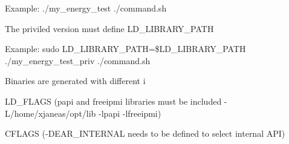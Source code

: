 Example\+: ./my\+\_\+energy\+\_\+test ./command.sh

The priviled version must define L\+D\+\_\+\+L\+I\+B\+R\+A\+R\+Y\+\_\+\+P\+A\+TH

Example\+: sudo L\+D\+\_\+\+L\+I\+B\+R\+A\+R\+Y\+\_\+\+P\+A\+TH=\$\+L\+D\+\_\+\+L\+I\+B\+R\+A\+R\+Y\+\_\+\+P\+A\+TH ./my\+\_\+energy\+\_\+test\+\_\+priv ./command.sh

Binaries are generated with different i


\begin{DoxyItemize}
\item L\+D\+\_\+\+F\+L\+A\+GS (papi and freeipmi libraries must be included -\/\+L/home/xjaneas/opt/lib -\/lpapi -\/lfreeipmi)
\item C\+F\+L\+A\+GS (-\/\+D\+E\+A\+R\+\_\+\+I\+N\+T\+E\+R\+N\+AL needs to be defined to select internal A\+PI) 
\end{DoxyItemize}